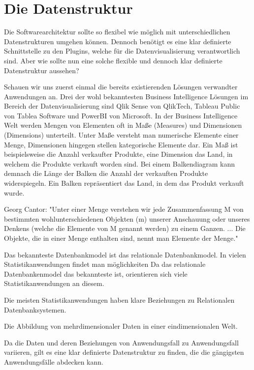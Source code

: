 
\section{Die Datenstruktur}
Die Softwarearchitektur sollte so flexibel wie möglich mit unterschiedlichen Datenstrukturen
umgehen können. Dennoch benötigt es eine klar definierte Schnittstelle zu den Plugins,
welche für die Datenvisualisierung verantwortlich sind. Aber wie sollte nun eine solche flexible 
und dennoch klar definierte Datenstruktur aussehen?

Schauen wir uns zuerst einmal die bereits existierenden Lösungen verwandter Anwendungen an. Drei der
wohl bekanntesten Business Intelligence Lösungen im Bereich der Datenvisualisierung sind Qlik Sense
von QlikTech, Tableau Public von Tablea Software und PowerBI von Microsoft. In der Business Intelligence
Welt werden Mengen von Elementen oft in Maße (Measures) und Dimensionen (Dimensions) unterteilt. Unter Maße versteht
man numerische Elemente einer Menge, Dimensionen hingegen stellen kategorische Elemente dar. Ein Maß
ist beispielsweise die Anzahl verkaufter Produkte, eine Dimension das Land, in welchem die Produkte verkauft worden
sind. Bei einem Balkendiagram kann demnach die Länge der Balken die Anzahl der verkauften Produkte
widerspiegeln. Ein Balken repräsentiert das Land, in dem das Produkt verkauft wurde.


Georg Cantor: "Unter einer Menge verstehen wir jede Zusammenfassung M von bestimmten wohlunterschiedenen
Objekten (m) unserer Anschauung oder unseres Denkens (welche die Elemente von M genannt werden) zu einem Ganzen.
... Die Objekte, die in einer Menge enthalten sind, nennt man Elemente der Menge."

Das bekannteste Datenbankmodel ist das relationale Datenbankmodel. In vielen Statistikanwendungen findet
man möglichkeiten
Da das relationale Datenbankenmodel das bekannteste ist, orientieren sich viele Statistikanwendungen an diesem.

Die meisten Statistikanwendungen haben klare Beziehungen zu Relationalen Datenbanksystemen. 

Die Abbildung von mehrdimensionaler Daten in einer eindimensionalen Welt.




Da die Daten und deren Beziehungen von Anwendungsfall zu Anwendungsfall
variieren, gilt es eine klar definierte Datenstruktur zu finden, die
die gängigsten Anwendungsfälle abdecken kann. 

